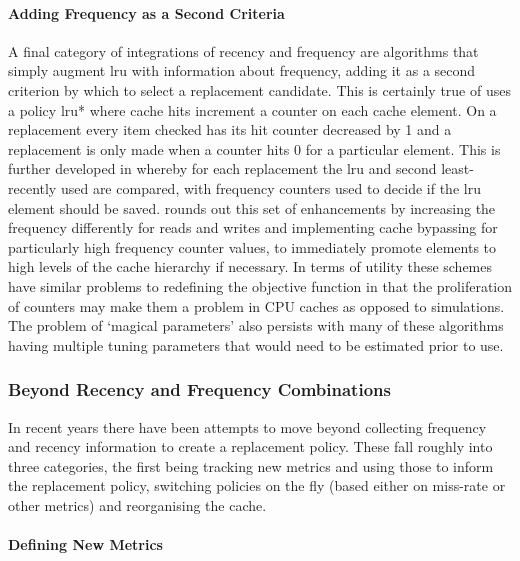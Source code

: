 \paragraph{Adding Frequency as a Second Criteria}

A final category of integrations of recency and frequency are algorithms that simply augment \gls{lru} with information about frequency, adding it as a second criterion by which to select a replacement candidate. This is certainly true of \citet{changLRUWWWProxy1999} uses a policy \gls{lru}* where cache hits increment a counter on each cache element. On a replacement every item checked has its hit counter decreased by 1 and a replacement is only made when a counter hits 0 for a particular element.  This is further developed in \citet{alghazoSFLRUCacheReplacement2004} whereby for each replacement the \gls{lru} and second least-recently used are compared, with frequency counters used to decide if the \gls{lru} element should be saved. \citet{dybdahlLRUbasedReplacementAlgorithm2006} rounds out this set of enhancements by increasing the frequency differently for reads and writes and implementing cache bypassing for particularly high frequency counter values, to immediately promote elements to high levels of the cache hierarchy if necessary. In terms of utility these schemes have similar problems to redefining the objective function in that the proliferation of counters may make them a problem in CPU caches as opposed to simulations. The problem of `magical parameters' also persists with many of these algorithms having multiple tuning parameters that would need to be estimated prior to use.


\subsubsection{Beyond Recency and Frequency Combinations}

In recent years there have been attempts to move beyond collecting frequency and recency information to create a replacement policy. These fall roughly into three categories, the first being tracking new metrics and using those to inform the replacement policy, switching policies on the fly (based either on miss-rate or other metrics) and reorganising the cache. 

\paragraph{Defining New Metrics}

